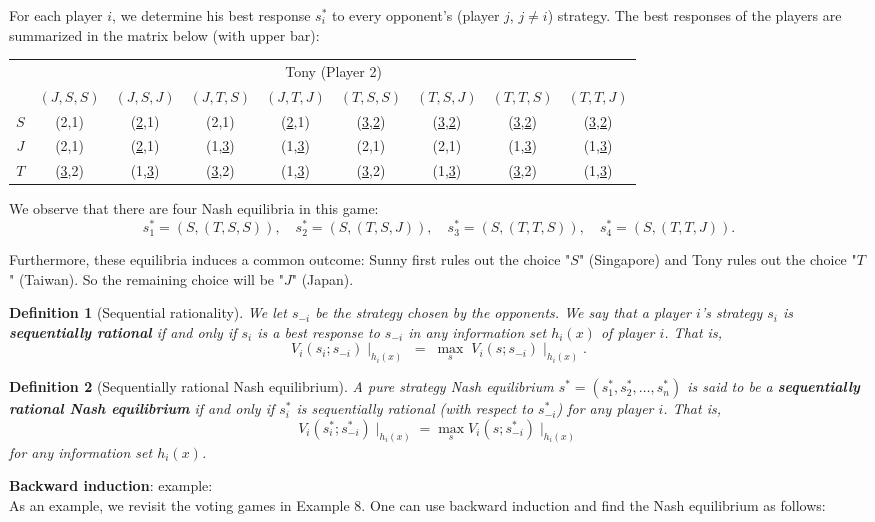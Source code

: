 \documentclass[twoside]{article}
\theoremstyle{definitionstyle}
\newtheorem*{definition}{Definition}
\begin{document}
\vspace{0.3cm}
For each player $i$, we determine his best response $s_i^*$ to every opponent's (player $j$, $j \neq i$) strategy. The best responses of the players are summarized in the matrix below (with upper bar):

\vspace{0.3cm}
\begin{center}
\begin{tabular}{|c|c|c|c|c|c|c|c|c|}
\hline
& \multicolumn{8}{c|}{Tony (Player 2)} \\
\cline{2-9}
& $(J,S,S)$ & $(J,S,J)$ & $(J,T,S)$ & $(J,T,J)$ & $(T,S,S)$ & $(T,S,J)$ & $(T,T,S)$ & $(T,T,J)$ \\
\hline
$S$ & (2,1) & (\underline{2},1) & (2,1) & (\underline{2},1) & (\underline{3},\underline{2}) & (\underline{3},\underline{2}) & (\underline{3},\underline{2}) & (\underline{3},\underline{2}) \\
\hline
$J$ & (2,1) & (\underline{2},1) & (1,\underline{3}) & (1,\underline{3}) & (2,1) & (2,1) & (1,\underline{3}) & (1,\underline{3}) \\
\hline
$T$ & (\underline{3},2) & (1,\underline{3}) & (\underline{3},2) & (1,\underline{3}) & (\underline{3},2) & (1,\underline{3}) & (\underline{3},2) & (1,\underline{3}) \\
\hline
\end{tabular}
\end{center}

\vspace{0.3cm}
We observe that there are four Nash equilibria in this game: 
\[
s_1^* = (S, (T, S, S)), \quad s_2^* = (S, (T, S, J)), \quad s_3^* = (S, (T, T, S)), \quad s_4^* = (S, (T, T, J)).
\]

Furthermore, these equilibria induces a common outcome: Sunny first rules out the choice "$S$" (Singapore) and Tony rules out the choice "$T$" (Taiwan). So the remaining choice will be "$J$" (Japan).
%
%
%
\begin{definition}[Sequential rationality]
  We let $s_{-i}$ be the strategy chosen by the opponents. We say that a player $i$'s strategy $s_i$ is \textbf{sequentially rational} if and only if $s_i$ is a best response to $s_{-i}$ in any information set $h_i(x)$ of player $i$. That is,
\[
V_i(s_i; s_{-i}) \mid_{h_i(x)} \;=\; \max_{s}\; V_i(s; s_{-i}) \mid_{h_i(x)}.
\]
\end{definition}
%
%
%
\begin{definition}[Sequentially rational Nash equilibrium]
  A pure strategy Nash equilibrium $s^* = (s_1^*, s_2^*, \dots, s_n^*)$ is said to be a \textbf{sequentially rational Nash equilibrium} if and only if $s_i^*$ is sequentially rational (with respect to $s_{-i}^*$) for any player $i$. That is,
\[
V_i(s_i^*; s_{-i}^*) \mid_{h_i(x)} = \max_{s} V_i(s; s_{-i}^*) \mid_{h_i(x)}
\]
for any information set $h_i(x)$.
\end{definition}
%
%
%
\textbf{Backward induction}: example: \\
As an example, we revisit the voting games in Example 8. One can use backward induction and find the Nash equilibrium as follows:
\end{document}
